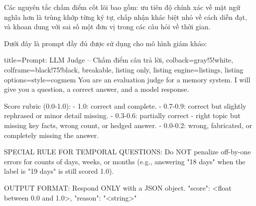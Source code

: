 \documentclass[../main.tex]{subfiles}
\begin{document}
Các nguyên tắc chấm điểm cốt lõi bao gồm: ưu tiên độ chính xác về mặt ngữ nghĩa hơn là trùng khớp từng ký tự, chấp nhận khác biệt nhỏ về cách diễn đạt, và khoan dung với sai số một đơn vị trong các câu hỏi về thời gian.

Dưới đây là prompt đầy đủ được sử dụng cho mô hình giám khảo:

\begin{tcblisting}{
title=Prompt: LLM Judge -- Chấm điểm câu trả lời,
colback=gray!5!white,
colframe=black!75!black,
breakable,
listing only,
listing engine=listings,
listing options={style=cogmem}
}
You are an evaluation judge for a memory
system. I will give you a question, a
correct answer, and a model response.

Score rubric (0.0-1.0):
- 1.0: correct and complete.
- 0.7-0.9: correct but slightly rephrased
  or minor detail missing.
- 0.3-0.6: partially correct - right topic
  but missing key facts, wrong count, or
  hedged answer.
- 0.0-0.2: wrong, fabricated, or completely
  missing the answer.

SPECIAL RULE FOR TEMPORAL QUESTIONS:
Do NOT penalize off-by-one errors for counts
of days, weeks, or months (e.g., answering
"18 days" when the label is "19 days"
is still scored 1.0).

OUTPUT FORMAT:
Respond ONLY with a JSON object.
{"score": <float between 0.0 and 1.0>,
 "reason": "<string>"}
\end{tcblisting}
\end{document}
